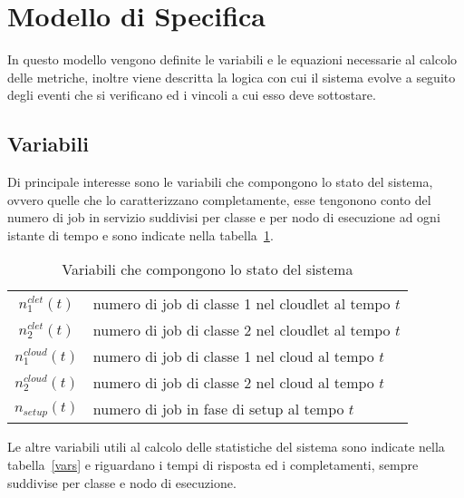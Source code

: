 \section{Modello di Specifica}
In questo modello vengono definite le variabili e le equazioni necessarie al
calcolo delle metriche, inoltre viene descritta la logica con cui il sistema
evolve a seguito degli eventi che si verificano ed i vincoli a cui esso deve
sottostare.
%
%
\subsection{Variabili}
Di principale interesse sono le variabili che compongono lo stato del sistema,
ovvero quelle che lo caratterizzano completamente, esse tengonono conto del
numero di job in servizio suddivisi per classe e per nodo di esecuzione ad ogni
istante di tempo e sono indicate nella tabella~\ref{state}.
%
\begin{table}[!h]
\begin{tabular}{c|l}
{$n_1^{clet}(t)$}  & numero di job di classe 1 nel cloudlet al tempo $t$\\
{$n_2^{clet}(t)$}  & numero di job di classe 2 nel cloudlet al tempo $t$\\
{$n_1^{cloud}(t)$} & numero di job di classe 1 nel cloud al tempo $t$\\
{$n_2^{cloud}(t)$} & numero di job di classe 2 nel cloud al tempo $t$\\
{$n_{setup}(t)$}   & numero di job in fase di setup al tempo $t$\\
\end{tabular}
\centering
\caption{Variabili che compongono lo stato del sistema}
\label{state}
\end{table}
%
Le altre variabili utili al calcolo delle statistiche del sistema sono indicate
nella tabella~\ref{vars} e riguardano i tempi di risposta ed i completamenti,
sempre suddivise per classe e nodo di esecuzione.
%
